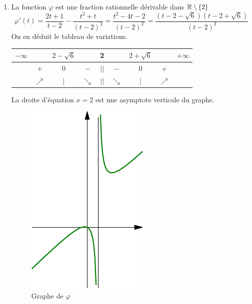 \begin{enumerate}
  \item La fonction $\varphi$ est une fraction rationnelle dérivable dans $\mathbb{R}\setminus\{2\}$
\begin{displaymath}
  \varphi'(t) = \frac{2t+1}{t-2} - \frac{t^2+t}{(t-2)^2}
  = \frac{t^2-4t-2}{(t-2)^2}
  = \frac{(t-2-\sqrt{6})(t-2+\sqrt{6})}{(t-2)^2}
\end{displaymath}
On en déduit le tableau de variations.
\begin{center}
\begin{tabular}{ccccccccc}
  $-\infty$ &            & $2-\sqrt{6}$ &            & 2    &            &$2+\sqrt{6}$ &            & $+\infty$ \\ \hline 
            & $+$        &     $0$      & $-$        & $||$ & $-$        &     $0$     & $+$        &           \\ \hline
            & $\nearrow$ &     $|$      & $\searrow$ & $||$ & $\searrow$ &     $|$     & $\nearrow$ &           \\ \hline
\end{tabular}
\end{center}
La droite d'équation $x=2$ est une asymptote verticale du graphe. 

\begin{figure}[h]
  \centering
  \includegraphics{./Celem16_1.pdf}
  \caption{Graphe de $\varphi$}
  \label{fig: Celem16_1}
\end{figure}


\end{enumerate}
